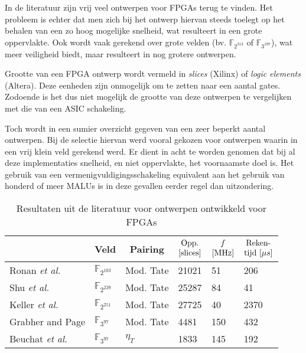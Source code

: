 In de literatuur zijn vrij veel ontwerpen voor FPGAs terug te vinden. Het probleem is echter dat men zich bij het ontwerp hiervan steeds toelegt op het behalen van een zo hoog mogelijke snelheid, wat resulteert in een grote oppervlakte. Ook wordt vaak gerekend over grote velden (bv. $\mathbb{F}_{2^{313}}$ of $\mathbb{F}_{3^{197}}$), wat meer veiligheid biedt, maar resulteert in nog grotere ontwerpen.

Grootte van een FPGA ontwerp wordt vermeld in \emph{slices} (Xilinx) of \emph{logic elements} (Altera). Deze eenheden zijn onmogelijk om te zetten naar een aantal gates. Zodoende is het dus niet mogelijk de grootte van deze ontwerpen te vergelijken met die van een ASIC schakeling.

Toch wordt in  een sumier overzicht gegeven van een zeer beperkt aantal ontwerpen. Bij de selectie hiervan werd vooral gekozen voor ontwerpen waarin in een vrij klein veld gerekend werd. Er dient in acht te worden genomen dat bij al deze implementaties snelheid, en niet oppervlakte, het voornaamste doel is. Het gebruik van een vermenigvuldigingsschakeling equivalent aan het gebruik van honderd of meer MALUs is in deze gevallen eerder regel dan uitzondering.

\begin{table}[h]
	\caption{Resultaten uit de literatuur voor ontwerpen ontwikkeld voor FPGAs}
	\label{tabel-resultaten-fpga}

	\centering
	\begin{tabular}{llllll}
		\toprule
		&	\multicolumn{1}{c}{Veld}	& \multicolumn{1}{c}{Pairing}	& $\begin{array}{@{}c@{}}\text{Opp.}\\\text{[slices]}\end{array}$	& $\begin{array}{@{}c@{}}f\\\text{[MHz]}\end{array}$	& $\begin{array}{@{}c@{}}\text{Reken-}\\\text{tijd }[\mu s]\end{array}$\\
		\midrule
		Ronan \emph{et al.} \cite{ronan}				& $\mathbb{F}_{2^{103}}$	& Mod. Tate	& 21021	& 51	& 206\\
		Shu \emph{et al.} \cite{shu}					& $\mathbb{F}_{2^{239}}$	& Mod. Tate	& 25287	& 84	& 41\\
		Keller \emph{et al.} \cite{keller}			& $\mathbb{F}_{2^{251}}$	& Mod. Tate	& 27725	& 40	& 2370\\
		Grabher and Page \cite{grabher}				& $\mathbb{F}_{3^{97}}$		& Mod. Tate	& 4481	& 150	& 432\\
		Beuchat \emph{et al.} \cite{beuchat-eta}	& $\mathbb{F}_{3^{97}}$		& $\eta_T$	& 1833	& 145	& 192\\
		\bottomrule
	\end{tabular}
\end{table}


